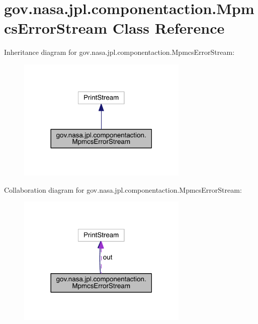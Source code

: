 \section{gov.\+nasa.\+jpl.\+componentaction.\+Mpmcs\+Error\+Stream Class Reference}
\label{classgov_1_1nasa_1_1jpl_1_1componentaction_1_1_mpmcs_error_stream}


Inheritance diagram for gov.\+nasa.\+jpl.\+componentaction.\+Mpmcs\+Error\+Stream\+:
\nopagebreak
\begin{figure}[H]
\begin{center}
\leavevmode
\includegraphics[width=230pt]{classgov_1_1nasa_1_1jpl_1_1componentaction_1_1_mpmcs_error_stream__inherit__graph}
\end{center}
\end{figure}


Collaboration diagram for gov.\+nasa.\+jpl.\+componentaction.\+Mpmcs\+Error\+Stream\+:
\nopagebreak
\begin{figure}[H]
\begin{center}
\leavevmode
\includegraphics[width=230pt]{classgov_1_1nasa_1_1jpl_1_1componentaction_1_1_mpmcs_error_stream__coll__graph}
\end{center}
\end{figure}
